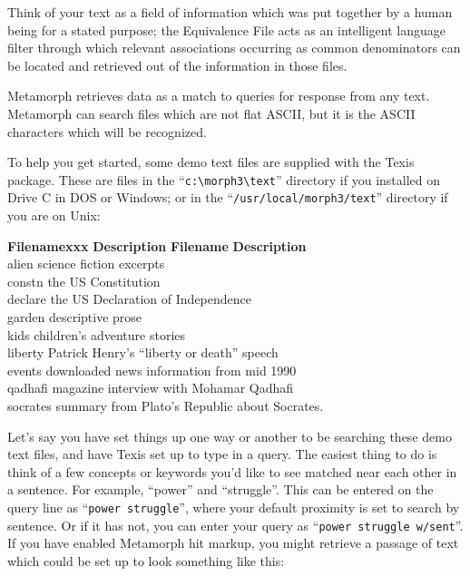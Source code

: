 Think of your text as a field of information which was put together by
a human being for a stated purpose; the Equivalence File acts as an
intelligent language filter through which relevant associations
occurring as common denominators can be located and retrieved out of
the information in those files.

Metamorph retrieves data as a match to queries for response from any
text.  Metamorph can search files which are not flat ASCII, but it is
the ASCII characters which will be recognized.

To help you get started, some demo text files are supplied with the
Texis package.  These are files in the ``\verb`c:\morph3\text`''
directory if you installed on Drive C in DOS or Windows; or in the
``\verb`/usr/local/morph3/text`'' directory if you are on Unix:

\begin{tabbing}
{\bf Filenamexxx} \= {\bf Description}  \kill
{\bf Filename} \> {\bf Description}  \\
alien       \> science fiction excerpts \\
constn      \> the US Constitution \\
declare     \> the US Declaration of Independence \\
garden      \> descriptive prose \\
kids        \> children's adventure stories \\
liberty     \> Patrick Henry's ``liberty or death'' speech \\
events      \> downloaded news information from mid 1990 \\
qadhafi     \> magazine interview with Mohamar Qadhafi \\
socrates    \> summary from Plato's Republic about Socrates.
\end{tabbing}

Let's say you have set things up one way or another to be searching
these demo text files, and have Texis set up to type in a query.  The
easiest thing to do is think of a few concepts or keywords you'd like
to see matched near each other in a sentence.  For example, ``power''
and ``struggle''.  This can be entered on the query line as
``\verb`power struggle`'', where your default proximity is set to
search by sentence.  Or if it has not, you can enter your query
as ``\verb`power struggle w/sent`''.  If you have enabled
Metamorph hit markup, you might retrieve a passage of text which
could be set up to look something like this:

